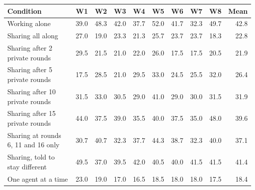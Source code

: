 \begin{tabular}{l rrrrrrrr r}
\toprule
Condition & W1 & W2 & W3 & W4 & W5 & W6 & W7 & W8 & Mean \\
\midrule
Working alone & 39.0 & 48.3 & 42.0 & 37.7 & 52.0 & 41.7 & 32.3 & 49.7 & 42.8 \\
Sharing all along & 27.0 & 19.0 & 23.3 & 21.3 & 25.7 & 23.7 & 23.7 & 18.3 & 22.8 \\
Sharing after 2 private rounds & 29.5 & 21.5 & 21.0 & 22.0 & 26.0 & 17.5 & 17.5 & 20.5 & 21.9 \\
Sharing after 5 private rounds & 17.5 & 28.5 & 21.0 & 29.5 & 33.0 & 24.5 & 25.5 & 32.0 & 26.4 \\
Sharing after 10 private rounds & 31.5 & 33.0 & 30.5 & 29.0 & 41.0 & 29.0 & 30.0 & 31.5 & 31.9 \\
Sharing after 15 private rounds & 44.0 & 37.5 & 39.0 & 35.5 & 40.0 & 37.5 & 35.0 & 48.0 & 39.6 \\
Sharing at rounds 6, 11 and 16 only & 30.7 & 40.7 & 32.3 & 37.7 & 44.3 & 38.7 & 32.3 & 40.0 & 37.1 \\
Sharing, told to stay different & 49.5 & 37.0 & 39.5 & 42.0 & 40.5 & 40.0 & 41.5 & 41.5 & 41.4 \\
One agent at a time & 23.0 & 19.0 & 17.0 & 16.5 & 18.5 & 18.0 & 18.0 & 17.5 & 18.4 \\
\bottomrule
\end{tabular}